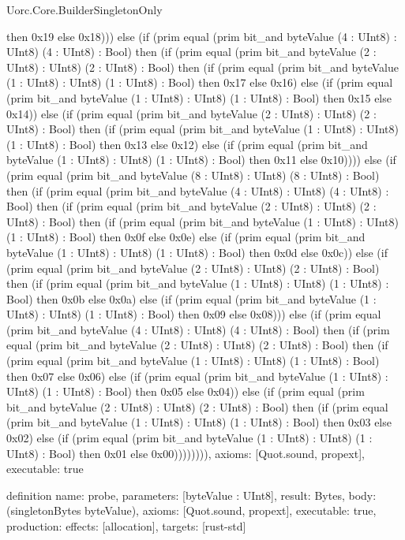 \begin{lexlean}{Uorc.Core.BuilderSingletonOnly}
\begin{semanticmodule}
{then 0x19 else 0x18))) else (if (prim equal (prim bit_and byteValue (4 : UInt8) : UInt8) (4 : UInt8) : Bool) then (if (prim equal (prim bit_and byteValue (2 : UInt8) : UInt8) (2 : UInt8) : Bool) then (if (prim equal (prim bit_and byteValue (1 : UInt8) : UInt8) (1 : UInt8) : Bool) then 0x17 else 0x16) else (if (prim equal (prim bit_and byteValue (1 : UInt8) : UInt8) (1 : UInt8) : Bool) then 0x15 else 0x14)) else (if (prim equal (prim bit_and byteValue (2 : UInt8) : UInt8) (2 : UInt8) : Bool) then (if (prim equal (prim bit_and byteValue (1 : UInt8) : UInt8) (1 : UInt8) : Bool) then 0x13 else 0x12) else (if (prim equal (prim bit_and byteValue (1 : UInt8) : UInt8) (1 : UInt8) : Bool) then 0x11 else 0x10)))) else (if (prim equal (prim bit_and byteValue (8 : UInt8) : UInt8) (8 : UInt8) : Bool) then (if (prim equal (prim bit_and byteValue (4 : UInt8) : UInt8) (4 : UInt8) : Bool) then (if (prim equal (prim bit_and byteValue (2 : UInt8) : UInt8) (2 : UInt8) : Bool) then (if (prim equal (prim bit_and byteValue (1 : UInt8) : UInt8) (1 : UInt8) : Bool) then 0x0f else 0x0e) else (if (prim equal (prim bit_and byteValue (1 : UInt8) : UInt8) (1 : UInt8) : Bool) then 0x0d else 0x0c)) else (if (prim equal (prim bit_and byteValue (2 : UInt8) : UInt8) (2 : UInt8) : Bool) then (if (prim equal (prim bit_and byteValue (1 : UInt8) : UInt8) (1 : UInt8) : Bool) then 0x0b else 0x0a) else (if (prim equal (prim bit_and byteValue (1 : UInt8) : UInt8) (1 : UInt8) : Bool) then 0x09 else 0x08))) else (if (prim equal (prim bit_and byteValue (4 : UInt8) : UInt8) (4 : UInt8) : Bool) then (if (prim equal (prim bit_and byteValue (2 : UInt8) : UInt8) (2 : UInt8) : Bool) then (if (prim equal (prim bit_and byteValue (1 : UInt8) : UInt8) (1 : UInt8) : Bool) then 0x07 else 0x06) else (if (prim equal (prim bit_and byteValue (1 : UInt8) : UInt8) (1 : UInt8) : Bool) then 0x05 else 0x04)) else (if (prim equal (prim bit_and byteValue (2 : UInt8) : UInt8) (2 : UInt8) : Bool) then (if (prim equal (prim bit_and byteValue (1 : UInt8) : UInt8) (1 : UInt8) : Bool) then 0x03 else 0x02) else (if (prim equal (prim bit_and byteValue (1 : UInt8) : UInt8) (1 : UInt8) : Bool) then 0x01 else 0x00)))))))),
  axioms: [Quot.sound, propext],
  executable: true
}

definition{
  name: probe,
  parameters: [byteValue : UInt8],
  result: Bytes,
  body: (singletonBytes byteValue),
  axioms: [Quot.sound, propext],
  executable: true,
  production: {effects: [allocation], targets: [rust-std]}
}
\end{semanticmodule}
\end{lexlean}
